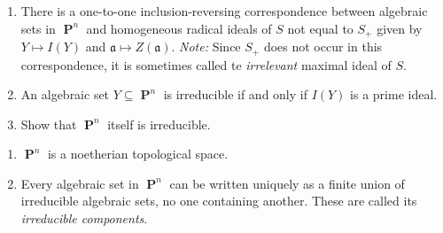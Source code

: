 \documentclass{hw_pset} %
\DeclareMathOperator{\pp}{\mathbf{P}} %
\begin{document}
\begin{solution}

\end{solution}

\begin{exercise}[Exercise 2.4]
    \begin{enumerate}
        \item There is a one-to-one inclusion-reversing correspondence between
        algebraic sets in $\pp^n$ and homogeneous radical ideals of $S$ not equal
        to $S_+$ given by $Y \mapsto I(Y)$ and $\mathfrak{a} \mapsto
        Z(\mathfrak{a})$. \emph{Note:} Since $S_{+}$ does not occur in this correspondence, 
        it is sometimes called te \emph{irrelevant} maximal ideal of $S$. 
        
        \item An algebraic set $Y \subseteq \pp^n$ is irreducible if and only if $I(Y)$ is a prime ideal. 
        \item Show that $\pp^n$ itself is irreducible. 
    \end{enumerate}
\end{exercise}

\begin{solution}

\end{solution}

\begin{exercise}[Exercise 2.5]
    \begin{enumerate}
        \item $\pp^n$ is a noetherian topological space. 
        \item Every algebraic set in $\pp^n$ can be written uniquely as a finite
          union of irreducible algebraic sets, no one containing another. These are
          called its \emph{irreducible components}. 
    \end{enumerate}
\end{exercise}

\begin{solution}

\end{solution}
\end{document}
